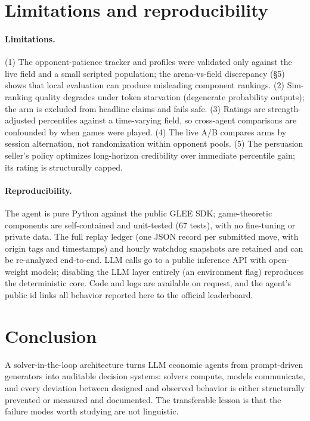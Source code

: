 \documentclass{article}
\begin{document}
\section{Limitations and reproducibility}
\paragraph{Limitations.} (1) The opponent-patience tracker and profiles were validated only against the live field and a small scripted population; the arena-vs-field discrepancy (\S5) shows that local evaluation can produce misleading component rankings. (2) Sim-ranking quality degrades under token starvation (degenerate probability outputs); the arm is excluded from headline claims and fails safe. (3) Ratings are strength-adjusted percentiles against a time-varying field, so cross-agent comparisons are confounded by when games were played. (4) The live A/B compares arms by session alternation, not randomization within opponent pools. (5) The persuasion seller's policy optimizes long-horizon credibility over immediate percentile gain; its rating is structurally capped.

\paragraph{Reproducibility.} The agent is pure Python against the public GLEE SDK; game-theoretic components are self-contained and unit-tested (67 tests), with no fine-tuning or private data. The full replay ledger (one JSON record per submitted move, with origin tags and timestamps) and hourly watchdog snapshots are retained and can be re-analyzed end-to-end. LLM calls go to a public inference API with open-weight models; disabling the LLM layer entirely (an environment flag) reproduces the deterministic core. Code and logs are available on request, and the agent's public id links all behavior reported here to the official leaderboard.

\section{Conclusion}
A solver-in-the-loop architecture turns LLM economic agents from prompt-driven generators into auditable decision systems: solvers compute, models communicate, and every deviation between designed and observed behavior is either structurally prevented or measured and documented. The transferable lesson is that the failure modes worth studying are not linguistic.
\end{document}
